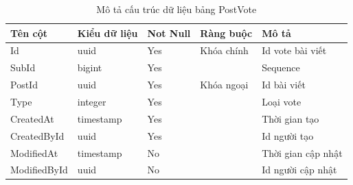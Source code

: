 \documentclass[../index.tex]{subfiles}
\begin{document}
    \begin{table}[H]
        \begin{tabular}{ |p{3cm}|p{2.5cm}|p{1.6cm}|p{2.2cm}|p{3cm}| }
            \hline
            Tên cột      & Kiểu dữ liệu             & Not Null & Ràng buộc  & Mô tả              \\
            \hline
            Id           & uuid                     & Yes      & Khóa chính & Id vote bài viết   \\
            \hline
            SubId        & bigint                   & Yes      &            & Sequence           \\
            \hline
            PostId       & uuid                     & Yes      & Khóa ngoại & Id bài viết        \\
            \hline
            Type         & integer                  & Yes      &            & Loại vote          \\
            \hline
            CreatedAt    & timestamp & Yes      &            & Thời gian tạo      \\
            \hline
            CreatedById  & uuid                     & Yes      &            & Id người tạo       \\
            \hline
            ModifiedAt   & timestamp & No       &            & Thời gian cập nhật \\
            \hline
            ModifiedById & uuid                     & No       &            & Id người cập nhật  \\
            \hline
        \end{tabular}
        \caption{Mô tả cấu trúc dữ liệu bảng PostVote}
    \end{table}
\end{document}
